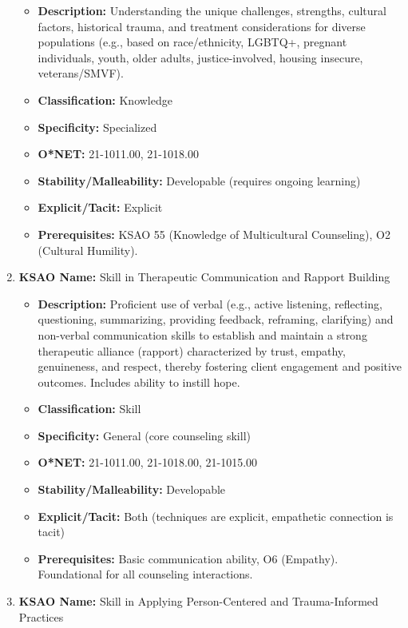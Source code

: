 \documentclass[
  letterpaper,
  DIV=11,
  numbers=noendperiod]{scrartcl}
\providecommand{\tightlist}{%
  \setlength{\itemsep}{0pt}\setlength{\parskip}{0pt}}
\begin{document}
\begin{enumerate}
  \begin{itemize}
  \tightlist
  \item
    \textbf{Description:} Understanding the unique challenges,
    strengths, cultural factors, historical trauma, and treatment
    considerations for diverse populations (e.g., based on
    race/ethnicity, LGBTQ+, pregnant individuals, youth, older adults,
    justice-involved, housing insecure, veterans/SMVF).
  \item
    \textbf{Classification:} Knowledge
  \item
    \textbf{Specificity:} Specialized
  \item
    \textbf{O*NET:} 21-1011.00, 21-1018.00
  \item
    \textbf{Stability/Malleability:} Developable (requires ongoing
    learning)
  \item
    \textbf{Explicit/Tacit:} Explicit
  \item
    \textbf{Prerequisites:} KSAO 55 (Knowledge of Multicultural
    Counseling), O2 (Cultural Humility).
  \end{itemize}
\item
  \textbf{KSAO Name:} Skill in Therapeutic Communication and Rapport
  Building

  \begin{itemize}
  \tightlist
  \item
    \textbf{Description:} Proficient use of verbal (e.g., active
    listening, reflecting, questioning, summarizing, providing feedback,
    reframing, clarifying) and non-verbal communication skills to
    establish and maintain a strong therapeutic alliance (rapport)
    characterized by trust, empathy, genuineness, and respect, thereby
    fostering client engagement and positive outcomes. Includes ability
    to instill hope.
  \item
    \textbf{Classification:} Skill
  \item
    \textbf{Specificity:} General (core counseling skill)
  \item
    \textbf{O*NET:} 21-1011.00, 21-1018.00, 21-1015.00
  \item
    \textbf{Stability/Malleability:} Developable
  \item
    \textbf{Explicit/Tacit:} Both (techniques are explicit, empathetic
    connection is tacit)
  \item
    \textbf{Prerequisites:} Basic communication ability, O6 (Empathy).
    Foundational for all counseling interactions.
  \end{itemize}
\item
  \textbf{KSAO Name:} Skill in Applying Person-Centered and
  Trauma-Informed Practices


\end{enumerate}
\end{document}
